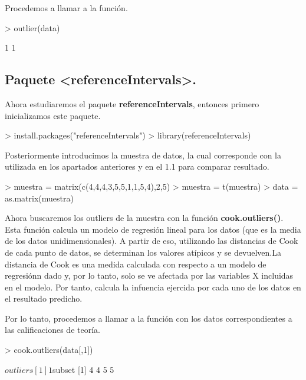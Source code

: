 \documentclass [a4paper] {article}
\begin{document}
\bigskip
Procedemos a llamar a la función.
\begin{Schunk}
\begin{Sinput}
> outlier(data)
\end{Sinput}
\begin{Soutput}
[1] 1 1
\end{Soutput}
\end{Schunk}

\subsection{Paquete <referenceIntervals>.}
\bigskip
Ahora estudiaremos el paquete \textbf{referenceIntervals}, entonces primero inicializamos este paquete.
\begin{Schunk}
\begin{Sinput}
> install.packages("referenceIntervals")
> library(referenceIntervals)
\end{Sinput}
\end{Schunk}

\bigskip
Posteriormente introducimos la muestra de datos, la cual corresponde con la utilizada en los apartados
anteriores y en el 1.1 para comparar resultado.
\begin{Schunk}
\begin{Sinput}
> muestra = matrix(c(4,4,4,3,5,5,1,1,5,4),2,5)
> muestra = t(muestra)
> data = as.matrix(muestra)
\end{Sinput}
\end{Schunk}

\bigskip
Ahora buscaremos los outliers de la muestra con la función \textbf{cook.outliers()}. Esta función calcula
un modelo de regresión lineal para los datos (que es la media de los datos unidimensionales). A partir de eso,
utilizando las distancias de Cook de cada punto de datos, se determinan los valores atípicos y se
devuelven.La distancia de Cook es una medida calculada con respecto a un modelo de regresiónn dado y, por lo tanto, 
solo se ve afectada por las variables X incluidas en el modelo. Por tanto, calcula la infuencia ejercida por cada 
uno de los datos en el resultado predicho.

\bigskip
Por lo tanto, procedemos a llamar a la función con los datos correspondientes a las calificaciones de teoría.
\begin{Schunk}
\begin{Sinput}
> cook.outliers(data[,1])
\end{Sinput}
\begin{Soutput}
$outliers
[1] 1

$subset
[1] 4 4 5 5
\end{Soutput}
\end{Schunk}
\end{document}
